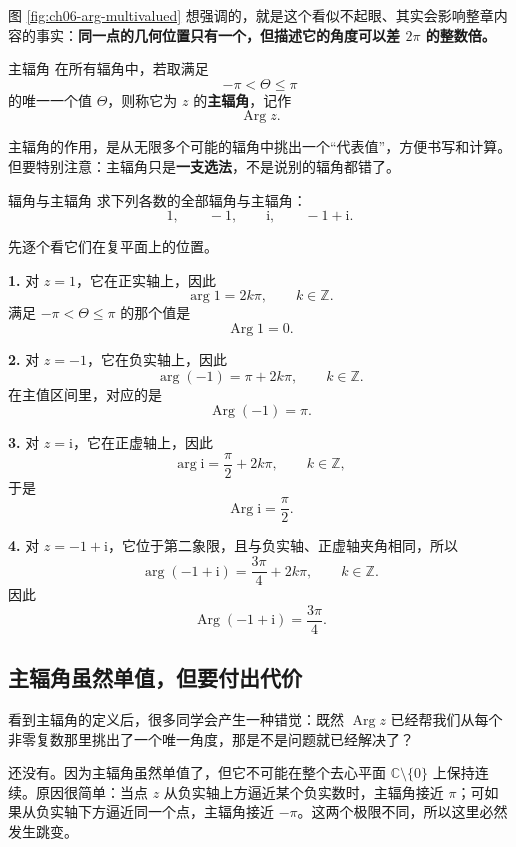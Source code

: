 图 \ref{fig:ch06-arg-multivalued} 想强调的，就是这个看似不起眼、其实会影响整章内容的事实：\textbf{同一点的几何位置只有一个，但描述它的角度可以差 $2\pi$ 的整数倍。}

\begin{dingliyi}{主辐角}{}
在所有辐角中，若取满足
\[
    -\pi<\Theta\le \pi
\]
的唯一一个值 $\Theta$，则称它为 $z$ 的\textbf{主辐角}，记作
\[
    \operatorname{Arg} z.
\]
\end{dingliyi}

\begin{zhu}{}{}
主辐角的作用，是从无限多个可能的辐角中挑出一个``代表值''，方便书写和计算。但要特别注意：主辐角只是\textbf{一支选法}，不是说别的辐角都错了。
\end{zhu}

\begin{lizi}{辐角与主辐角}{}
求下列各数的全部辐角与主辐角：
\[
    1,\qquad -1,\qquad \mathrm{i},\qquad -1+\mathrm{i}.
\]

\begin{jie}
先逐个看它们在复平面上的位置。

\textbf{1.} 对 $z=1$，它在正实轴上，因此
\[
    \arg 1 = 2k\pi,\qquad k\in\mathbb{Z}.
\]
满足 $-\pi<\Theta\le \pi$ 的那个值是
\[
    \operatorname{Arg}1=0.
\]

\textbf{2.} 对 $z=-1$，它在负实轴上，因此
\[
    \arg(-1)=\pi+2k\pi,\qquad k\in\mathbb{Z}.
\]
在主值区间里，对应的是
\[
    \operatorname{Arg}(-1)=\pi.
\]

\textbf{3.} 对 $z=\mathrm{i}$，它在正虚轴上，因此
\[
    \arg \mathrm{i}=\frac{\pi}{2}+2k\pi,\qquad k\in\mathbb{Z},
\]
于是
\[
    \operatorname{Arg}\mathrm{i}=\frac{\pi}{2}.
\]

\textbf{4.} 对 $z=-1+\mathrm{i}$，它位于第二象限，且与负实轴、正虚轴夹角相同，所以
\[
    \arg(-1+\mathrm{i})=\frac{3\pi}{4}+2k\pi,\qquad k\in\mathbb{Z}.
\]
因此
\[
    \operatorname{Arg}(-1+\mathrm{i})=\frac{3\pi}{4}.
\]
\end{jie}
\end{lizi}

\subsection{主辐角虽然单值，但要付出代价}

看到主辐角的定义后，很多同学会产生一种错觉：既然 $\operatorname{Arg} z$ 已经帮我们从每个非零复数那里挑出了一个唯一角度，那是不是问题就已经解决了？

还没有。因为主辐角虽然单值了，但它不可能在整个去心平面 $\mathbb{C}\setminus\{0\}$ 上保持连续。原因很简单：当点 $z$ 从负实轴上方逼近某个负实数时，主辐角接近 $\pi$；可如果从负实轴下方逼近同一个点，主辐角接近 $-\pi$。这两个极限不同，所以这里必然发生跳变。

